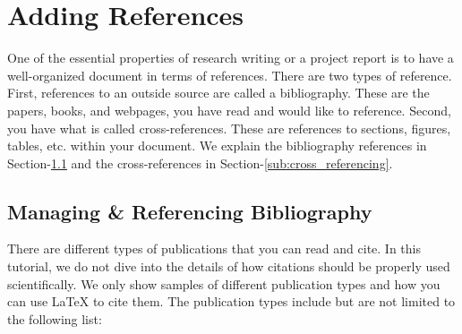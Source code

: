 \section{Adding References}
\label{sec:adding_references}

One of the essential properties of research writing or a project report is to have a well-organized document in terms of references. There are two types of reference. First, references to an outside source are called a bibliography. These are the papers, books, and webpages, you have read and would like to reference. Second, you have what is called cross-references. These are references to sections, figures, tables, etc. within your document. We explain the bibliography references in Section-\ref{sub:managing_and_referencing_bibliography} and the cross-references in Section-\ref{sub:cross_referencing}.


\subsection{Managing \& Referencing Bibliography}
\label{sub:managing_and_referencing_bibliography}

There are different types of publications that you can read and cite. In this tutorial, we do not dive into the details of how citations should be properly used scientifically. We only show samples of different publication types and how you can use {\LaTeX} to cite them. The publication types include but are not limited to the following list:

